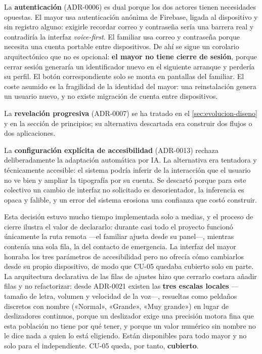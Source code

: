 La \textbf{autenticación} (ADR-0006) es dual porque los dos actores tienen necesidades opuestas. El mayor
usa autenticación anónima de Firebase, ligada al dispositivo y sin registro alguno: exigirle recordar
correo y contraseña sería una barrera real y contradiría la interfaz \emph{voice-first}. El familiar usa
correo y contraseña porque necesita una cuenta portable entre dispositivos. De ahí se sigue un corolario
arquitectónico que no es opcional: \textbf{el mayor no tiene cierre de sesión}, porque cerrar sesión
generaría un identificador nuevo en el siguiente arranque y perdería su perfil. El botón correspondiente
solo se monta en pantallas del familiar. El coste asumido es la fragilidad de la identidad del mayor: una
reinstalación genera un usuario nuevo, y no existe migración de cuenta entre dispositivos.

La \textbf{revelación progresiva} (ADR-0007) se ha tratado en el \autoref{sec:evolucion-diseno} y en la
sección de principios; su alternativa descartada era construir dos flujos o dos aplicaciones.

La \textbf{configuración explícita de accesibilidad} (ADR-0013) rechaza deliberadamente la adaptación
automática por IA. La alternativa era tentadora y técnicamente accesible: el sistema podría inferir de la
interacción que el usuario no ve bien y ampliar la tipografía por su cuenta. Se descartó porque para este
colectivo un cambio de interfaz no solicitado es desorientador, la inferencia es opaca y falible, y un
error del sistema erosiona una confianza que costó construir.

Esta decisión estuvo mucho tiempo implementada solo a medias, y el proceso de cierre ilustra el valor de
declararlo: durante casi todo el proyecto funcionó únicamente la ruta remota ---el familiar ajusta desde su
panel---, mientras  contenía una sola fila, la del contacto de emergencia. La
interfaz del mayor honraba los tres parámetros de accesibilidad pero no ofrecía cómo cambiarlos desde su
propio dispositivo, de modo que CU-05 quedaba cubierto solo en parte. La arquitectura declarativa de las
filas de ajustes hizo que cerrarlo costara añadir filas y no refactorizar: desde ADR-0021 existen las
\textbf{tres escalas locales} ---tamaño de letra, volumen y velocidad de la voz---, resueltas como peldaños
discretos con nombre («Normal», «Grande», «Muy grande») en lugar de deslizadores continuos, porque un
deslizador exige una precisión motora fina que esta población no tiene por qué tener, y porque un valor
numérico sin nombre no le dice nada a quien lo está eligiendo. Están disponibles para todo mayor y no solo
para el independiente. CU-05 queda, por tanto, \textbf{cubierto}.

